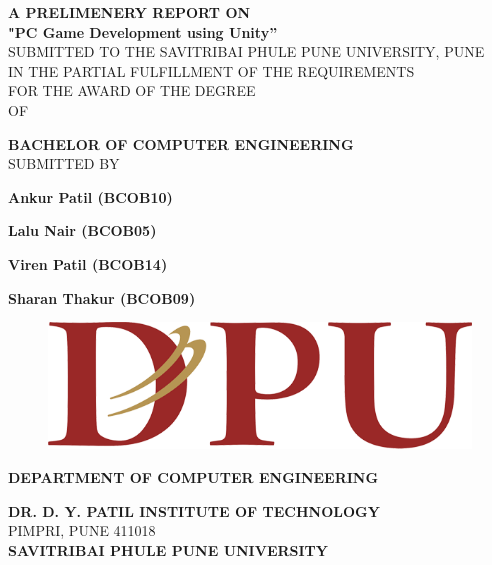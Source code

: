 \documentclass[12pt]{report}
\begin{document}
\centering \large \textbf  {A PRELIMENERY REPORT ON   }\\
\vspace{0.75 cm}
\Large \textbf{"PC Game Development using Unity”}\\
\vspace{0.5 cm}
\normalsize{SUBMITTED TO THE SAVITRIBAI PHULE PUNE UNIVERSITY, PUNE}\\
\normalsize{IN THE PARTIAL FULFILLMENT OF THE REQUIREMENTS}\\
\normalsize{  FOR THE AWARD OF THE DEGREE}\\
\vspace{0.75 cm}
\normalsize {OF}\\
\vspace{0.75 cm}

\Large\textbf{BACHELOR OF COMPUTER ENGINEERING}\\
\vspace{0.8 cm}
\large{SUBMITTED BY}\\
\vspace{0.3 cm}

\large \textbf  {Ankur Patil (BCOB10)}

\large \textbf  {Lalu Nair (BCOB05) }

\large \textbf {Viren Patil (BCOB14)}

\large \textbf {Sharan Thakur (BCOB09)}

\begin{figure}[h]
\centering
\includegraphics[scale=0.25]{Logo.png }
\end{figure}

\centering \Large \textbf  {DEPARTMENT OF COMPUTER ENGINEERING}\\
\vspace{0.4cm}

\large \textbf  {DR. D. Y. PATIL INSTITUTE OF TECHNOLOGY}\\
\normalsize {PIMPRI, PUNE 411018}\\
\vspace{0.2 cm}
\large \textbf{SAVITRIBAI PHULE PUNE UNIVERSITY}\\
\end{document}
